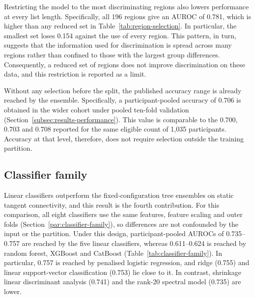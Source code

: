 Restricting the model to the most discriminating regions also lowers performance at every
list length. Specifically, all 196 regions give an AUROC of 0.781, which is higher than any
reduced set in Table~\ref{tab:region-selection}. In particular, the smallest set loses 0.154
against the use of every region. This pattern, in turn, suggests that the information used
for discrimination is spread across many regions rather than confined to those with the
largest group differences. Consequently, a reduced set of regions does not improve
discrimination on these data, and this restriction is reported as a limit.

Without any selection before the split, the published accuracy range is already reached by
the ensemble. Specifically, a participant-pooled accuracy of 0.706 is obtained in the wider
cohort under pooled ten-fold validation (Section~\ref{subsec:results-performance}). This value is
comparable to the 0.700, 0.703 and 0.708 reported for the same eligible count of 1,035
participants. Accuracy at that level, therefore, does not require selection
outside the training partition.

\subsection{Classifier family}
\label{subsec:results-classifier-family}

Linear classifiers outperform the fixed-configuration tree ensembles on static tangent
connectivity, and this result is the fourth contribution. For this comparison, all eight
classifiers use the same features, feature scaling and outer folds
(Section~\ref{par:classifier-family}), so differences are not confounded by the input or the partition.
Under this design, participant-pooled AUROCs of 0.735--0.757 are reached by the five linear
classifiers, whereas 0.611--0.624 is reached by random forest, XGBoost and CatBoost
(Table~\ref{tab:classifier-family}). In particular, 0.757 is reached by penalised logistic
regression, and ridge (0.755) and linear support-vector classification (0.753) lie close to
it.
In contrast, shrinkage linear discriminant analysis (0.741) and the rank-20 spectral model
(0.735) are lower.


